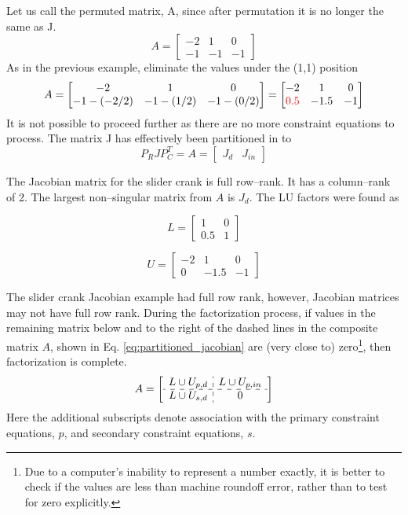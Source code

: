 \documentclass[12pt]{article}   %
\begin{document}
Let us call the permuted matrix, A, since after permutation it is no longer the same as J.
\begin{equation}
A=\begin{bmatrix}
-2 & 1 & 0\\
-1 & -1 & -1
\end{bmatrix}
\end{equation}
As in the previous example, eliminate the values under the (1,1) position \begin{equation}
A=\begin{bmatrix}
-2 & 1 & 0\\
-1-(-2/2) & -1-(1/2) & -1-(0/2)
\end{bmatrix}=
\begin{bmatrix}
-2 & 1 & 0\\
{\color{red}0.5} & -1.5 & -1
\end{bmatrix}
\end{equation}
It is not possible to proceed further as there are no more constraint equations to process. The matrix J has effectively been partitioned in to 
\begin{equation}
P_RJP^T_C=A=\begin{bmatrix}J_d & J_{in}\end{bmatrix}
\end{equation}

The Jacobian matrix for the slider crank is full row--rank. It has a column--rank of 2. The largest non--singular matrix from $A$ is $J_d$. The LU factors were found as

\begin{equation}
L=\begin{bmatrix}
1 & 0 \\
0.5 & 1
\end{bmatrix}
\end{equation}

\begin{equation}
U=\begin{bmatrix}
-2 & 1 & 0\\
0 & -1.5 & -1
\end{bmatrix}
\end{equation}

The slider crank Jacobian example had full row rank, however, Jacobian matrices may not have full row rank. During the factorization process, if values in the remaining matrix below and to the right of the dashed lines in the composite matrix $A$, shown in Eq. \ref{eq:partitioned_jacobian} are (very close to) zero\footnote{Due to a computer's inability to represent a number exactly, it is better to check if the values are less than machine roundoff error, rather than to test for zero explicitly.}, then factorization is complete.
\begin{equation}
A=\left[
\begin{array}{c:cc}
L\cup U_{p,d} & L\cup U_{p,in} \\
\hdashline
L \cup U_{s,d} & 0 
\end{array}
\right]
\label{eq:partitioned_jacobian}
\end{equation}
Here the additional subscripts denote association with the primary constraint equations, $p$, and secondary constraint equations, $s$.
 
\end{document}
